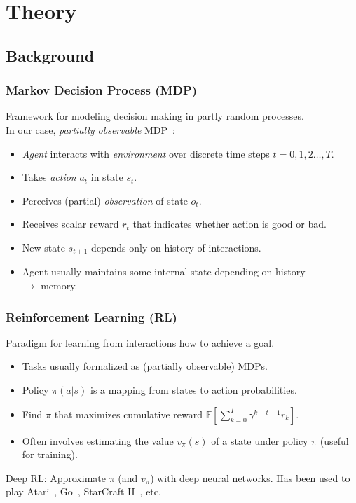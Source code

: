 \section{Theory}

\subsection{Background}

\begin{frame}
    \frametitle{Markov Decision Process (MDP)}
    
    Framework for modeling decision making in partly random processes.\\
    In our case, \textit{partially observable} MDP~\cite{kaelbling_planning_1998}:

    \begin{itemize}
        \item \textit{Agent} interacts with \textit{environment} over discrete time steps \(t = 0, 1, 2\dots, T\).
        \item Takes \textit{action} \(a_t\) in state \(s_t\).
        \item Perceives (partial) \textit{observation} of state \(o_t\).
        \item Receives scalar reward \(r_t\) that indicates whether action is good or bad.
        \item New state \(s_{t+1}\) depends only on history of interactions.
        \item Agent usually maintains some internal state depending on history \\
        \(\rightarrow\) memory.
    \end{itemize}

    \begin{figure}
        \centering
        \scalebox{0.75}{}
    \end{figure}
\end{frame}

\begin{frame}
    \frametitle{Reinforcement Learning (RL)}

    Paradigm for learning from interactions how to achieve a goal.

    \begin{itemize}
        \item Tasks usually formalized as (partially observable) MDPs.
        \item Policy \(\pi(a|s)\) is a mapping from states to action probabilities.
        \item Find \(\pi\) that maximizes cumulative reward \(\mathbb{E} \left\lbrack \sum_{k=0}^{T} \gamma^{k-t-1} r_k \right\rbrack\).
        \item Often involves estimating the value \(v_\pi(s)\) of a state under policy \(\pi\) (useful for training). 
    \end{itemize}

    Deep RL: Approximate \(\pi\) (and \(v_\pi\)) with deep neural networks.
    Has been used to play Atari~\cite{mnih_human-level_2015}, Go~\cite{silver_mastering_2016}, StarCraft II~\cite{vinyals_grandmaster_2019}, etc.
\end{frame}
